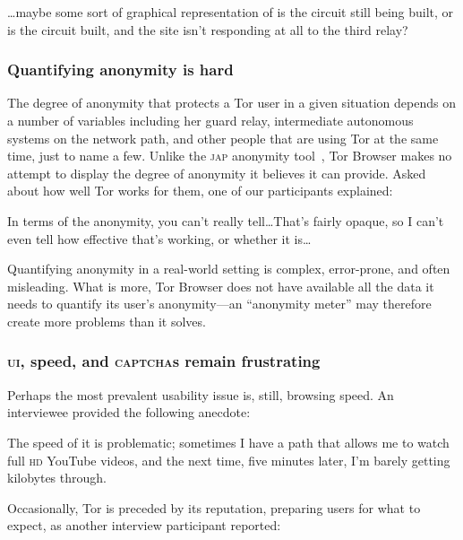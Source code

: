 \begin{displayquote}[P05]
\dots maybe some sort of graphical representation of is the circuit still
being built, or is the circuit built, and the site isn't responding at all to
the third relay?
\end{displayquote}

\subsubsection{Quantifying anonymity is hard}

The degree of anonymity that protects a Tor user in a given situation depends on
a number of variables including her guard relay, intermediate autonomous systems
on the network path, and other people that are using Tor at the same time, just
to name a few.  Unlike the \textsc{jap} anonymity tool~\cite{jap}, Tor Browser
makes no attempt to display the degree of anonymity it believes it can provide.
Asked about how well Tor works for them, one of our participants explained:

\begin{displayquote}[P12]
In terms of the anonymity, you can't really tell\dots That's fairly opaque, so I
can't even tell how effective that's working, or whether it is\dots
\end{displayquote}

Quantifying anonymity in a real-world setting is complex, error-prone, and often
misleading.  What is more, Tor Browser does not have available all the data it
needs to quantify its user's anonymity---an ``anonymity meter'' may therefore
create more problems than it solves.

\subsubsection{\textsc{ui}, speed, and \textsc{captcha}s remain frustrating}

Perhaps the most prevalent usability issue is, still, browsing speed.  An
interviewee provided the following anecdote:

\begin{displayquote}[P01]
The speed of it is problematic; sometimes I have a path that allows me to watch
full \textsc{hd} YouTube videos, and the next time, five minutes later, I'm
barely getting kilobytes through.
\end{displayquote}

Occasionally, Tor is preceded by its reputation, preparing users for what to
expect, as another interview participant reported:

